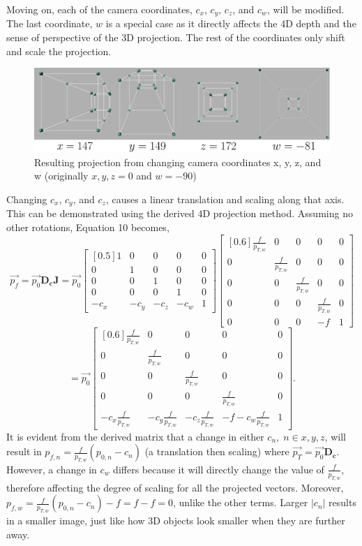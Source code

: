 \documentclass[12pt, letterpaper]{article}
\begin{document}
Moving on, each of the camera coordinates, $c_x$, $c_y$, $c_z$, and $c_w$, will be modified. The last coordinate, $w$ is a special case as it directly affects the 4D depth and the sense of perspective of the 3D projection. The rest of the coordinates only shift and scale the projection.
\begin{figure}[H]
\centering
\includegraphics[width=17cm]{camera_coordinates.png}
\caption{Resulting projection from changing camera coordinates x, y, z, and w (originally $x,y,z = 0$ and $w = -90$)}
\label{fig:figure}
\end{figure}
Changing $c_x$, $c_y$, and $c_z$, causes a linear translation and scaling along that axis. This can be demonstrated using the derived 4D projection method. Assuming no other rotations, Equation 10 becomes, 
$$\vec{p_f} = \vec{p_0}\mathbf{D_c}\mathbf{J} = \vec{p_0}\begin{bmatrix}[0.5] 1 & 0 & 0 & 0 & 0 \\ 0 & 1 & 0 & 0 & 0 \\ 0 & 0 & 1 & 0 & 0 \\ 0 & 0 & 0 & 1 & 0 \\ -c_x & -c_y & -c_z & -c_w & 1 \end{bmatrix} \begin{bmatrix}[0.6] \frac{f}{p_{T, w}} & 0 & 0 & 0 & 0\\ 0 & \frac{f}{p_{T, w}} & 0 & 0 & 0 \\ 0 & 0 & \frac{f}{p_{T, w}} & 0 & 0 \\ 0 & 0 & 0 & \frac{f}{p_{T, w}} & 0  \\ 0 & 0 & 0 & -f & 1   \end{bmatrix}$$
$$=\vec{p_0} \begin{bmatrix}[0.6] \frac{f}{p_{T, w}} & 0 & 0 & 0 & 0\\ 0 & \frac{f}{p_{T, w}} & 0 & 0 & 0 \\ 0 & 0 & \frac{f}{p_{T, w}} & 0 & 0 \\ 0 & 0 & 0 & \frac{f}{p_{T, w}} & 0  \\ -c_x\frac{f}{p_{T, w}} & -c_y\frac{f}{p_{T, w}} & -c_z\frac{f}{p_{T, w}} & -f-c_w\frac{f}{p_{T, w}} & 1   \end{bmatrix}.$$
It is evident from the derived matrix that a change in either $c_n,\;n \in x,y,z$, will result in $p_{f, n} = \frac{f}{p_{T, w}}(p_{0,n}-c_n)$ (a translation then scaling) where $\vec{p_T} = \vec{p_0}\mathbf{D_c}$. However, a change in $c_w$ differs because it will directly change the value of $\frac{f}{p_{T,w}}$, therefore affecting the degree of scaling for all the projected vectors. Moreover, $p_{f,w} = \frac{f}{p_{T, w}}(p_{0,n} - c_n) - f = f-f = 0$, unlike the  other terms. Larger $|c_n|$ results in a smaller image, just like how 3D objects look smaller when they are further away.
\end{document}
